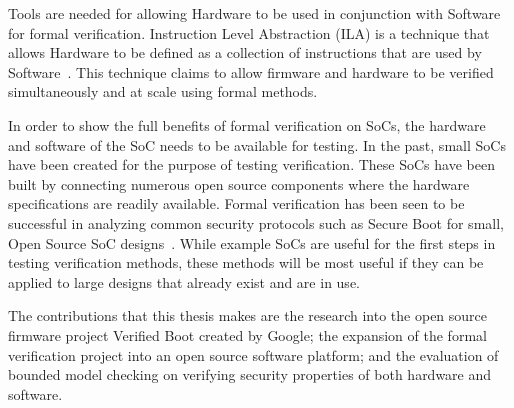 \documentclass[../report.tex]{subfiles}
\begin{document}
Tools are needed for allowing Hardware to be used in conjunction with Software for formal verification.
Instruction Level Abstraction (ILA) is a technique that allows Hardware to
be defined as a collection of instructions that are used by Software~\cite{ila}.
This technique claims to allow firmware and hardware to be verified simultaneously and at scale using formal methods.

In order to show the full benefits of formal verification on SoCs, the hardware
and software of the SoC needs to be available for testing.
In the past, small SoCs have been created for the purpose of testing verification.
These SoCs have been built by connecting numerous open source components where the hardware specifications are readily available.
Formal verification has been seen to be successful in analyzing common security protocols such as Secure Boot for small, Open Source SoC designs~\cite{elane}. 
While example SoCs are useful for the first steps in testing verification methods, these methods will be most useful if they can be applied to large designs that already exist and are in use.

The contributions that this thesis makes are the research into the open source firmware project Verified Boot created by Google; the expansion of the formal verification project into an open source software platform; and the evaluation of bounded model checking on verifying security properties of both hardware and software.

\end{document}
